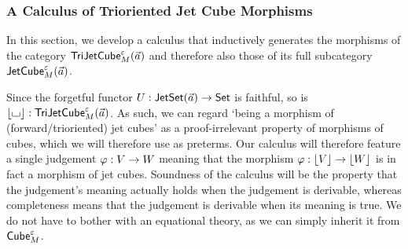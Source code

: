 \documentclass[a4paper]{article}
\begin{document}
\subsubsection{A Calculus of Trioriented Jet Cube Morphisms}
In this section, we develop a calculus that inductively generates the morphisms of the category $\mathsf{TriJetCube}^{\varepsilon}_{M}\mathopen{}\left( \vec a \right)\mathclose{}$ and therefore also those of its full subcategory $\mathsf{JetCube}^{\varepsilon}_{M}\mathopen{}\left( \vec a \right)\mathclose{}$.

Since the forgetful functor $U : \mathsf{JetSet}(\vec a) \to {\mathsf{Set}}$ is faithful, so is $\mathopen{}\left\lfloor {\llcorner\hspace{-.4ex}\lrcorner} \right\rfloor\mathclose{} : \mathsf{TriJetCube}^{\varepsilon}_{M}\mathopen{}\left( \vec a \right)\mathclose{}$.
As such, we can regard `being a morphism of (forward/trioriented) jet cubes' as a proof-irrelevant property of morphisms of cubes, which we will therefore use as preterms.
Our calculus will therefore feature a single judgement $\varphi : V \to W$ meaning that the morphism $\varphi : \mathopen{}\left\lfloor V \right\rfloor\mathclose{} \to \mathopen{}\left\lfloor W \right\rfloor\mathclose{}$ is in fact a morphism of jet cubes.
Soundness of the calculus will be the property that the judgement's meaning actually holds when the judgement is derivable, whereas completeness means that the judgement is derivable when its meaning is true.
We do not have to bother with an equational theory, as we can simply inherit it from ${\mathsf{Cube}}_M^\varepsilon$.
\end{document}
